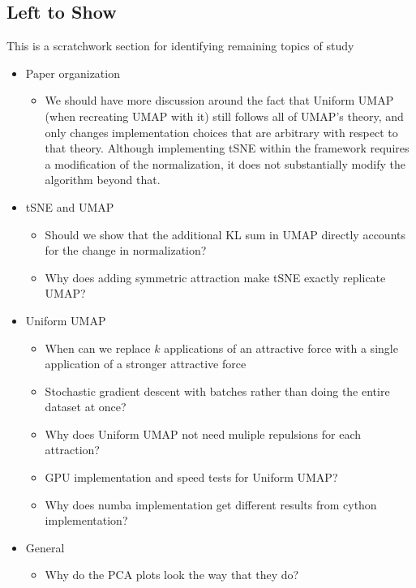 \documentclass{article}
\theoremstyle{definition}
\begin{document}
\begin{multicols}{2}
\section{Left to Show}
This is a scratchwork section for identifying remaining topics of study
\begin{itemize}
    \item Paper organization
        \begin{itemize}
            \item We should have more discussion around the fact that Uniform UMAP (when recreating UMAP with it) still follows all of UMAP's theory, and only
                changes implementation choices that are arbitrary with respect to that theory. Although implementing tSNE within the framework requires
                a modification of the normalization, it does not substantially modify the algorithm beyond that.
        \end{itemize}
    \item tSNE and UMAP
        \begin{itemize}
            \item Should we show that the additional KL sum in UMAP directly accounts for the change in normalization?
            \item Why does adding symmetric attraction make tSNE exactly replicate UMAP?
        \end{itemize}
    \item Uniform UMAP
        \begin{itemize}
            \item When can we replace $k$ applications of an attractive force with a single application of a stronger attractive force
            \item Stochastic gradient descent with batches rather than doing the entire dataset at once?
            \item Why does Uniform UMAP not need muliple repulsions for each attraction?
            \item GPU implementation and speed tests for Uniform UMAP?
            \item Why does numba implementation get different results from cython implementation?
        \end{itemize}
    \item General
        \begin{itemize}
            \item Why do the PCA plots look the way that they do?
        \end{itemize}
\end{itemize}

\end{multicols}
\printbibliography
\end{document}
